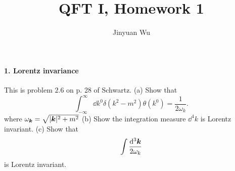 \documentclass[hyperref, a4paper]{article}
\title{QFT I, Homework 1}
\author{Jinyuan Wu}
\begin{document}
\maketitle

\paragraph{1. Lorentz invariance} This is problem $2.6$ on p. 28 of Schwartz.
(a) Show that
\begin{equation}
    \int_{-\infty}^{\infty} \dd k^{0} \delta\left(k^{2}-m^{2}\right) \theta\left(k^{0}\right)=\frac{1}{2 \omega_{k}}.
    \label{eq:sch-2.6-1}
\end{equation}
where $\omega_{\vb*{k}}=\sqrt{|\vb*{k}|^{2}+m^{2}}$
(b) Show the integration measure $\dd^{4} k$ is Lorentz invariant.
(c) Show that
\[
\int \frac{\dd^{3} \vb*{k}}{2 \omega_{k}}
\]
is Lorentz invariant.
\end{document}
